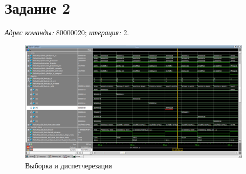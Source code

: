 \section{Задание 2}
\textit{Адрес команды: }80000020; \textit{итерация: }2. 

\begin{figure}[ht!]
\centering
\includegraphics[width=170mm]{./img/task2.png}
\caption{Выборка и диспетчерезация \label{overflow}}
\end{figure}